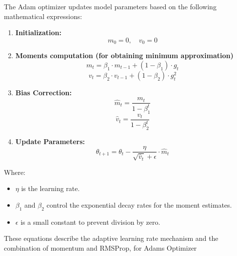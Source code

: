 The Adam optimizer updates model parameters based on the following mathematical expressions:

\begin{enumerate}
    \item \textbf{Initialization:}
    \[ m_0 = 0, \quad v_0 = 0 \]
    
    \item \textbf{Moments computation (for obtaining minimum approximation)}
    \[ m_t = \beta_1 \cdot m_{t-1} + (1 - \beta_1) \cdot g_t \]
    \[ v_t = \beta_2 \cdot v_{t-1} + (1 - \beta_2) \cdot g_t^2 \]
    
    \item \textbf{Bias Correction:}
    \[ \hat{m}_t = \frac{m_t}{1 - \beta_1^t} \]
    \[ \hat{v}_t = \frac{v_t}{1 - \beta_2^t} \]
    
    \item \textbf{Update Parameters:}
    \[ \theta_{t+1} = \theta_t - \frac{\eta}{\sqrt{\hat{v}_t} + \epsilon} \cdot \hat{m}_t \]
\end{enumerate}

Where:
\begin{itemize}
    \item \( \eta \) is the learning rate.
    \item \( \beta_1 \) and \( \beta_2 \) control the exponential decay rates for the moment estimates.
    \item \( \epsilon \) is a small constant to prevent division by zero.
\end{itemize}

These equations describe the adaptive learning rate mechanism and the combination of momentum and RMSProp, for Adams Optimizer





